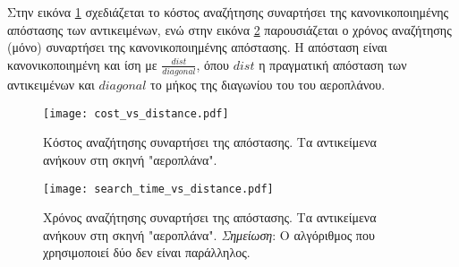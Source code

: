 Στην εικόνα \ref{fig:cost_metric_vs_distance} 
σχεδιάζεται το κόστος αναζήτησης συναρτήσει της 
κανονικοποιημένης απόστασης των αντικειμένων, 
ενώ στην εικόνα \ref{fig:search_time_vs_distance} 
παρουσιάζεται ο χρόνος αναζήτησης (μόνο) συναρτήσει 
της κανονικοποιημένης απόστασης. 
Η απόσταση είναι κανονικοποιημένη και ίση με 
$\frac{dist}{diagonal}$, όπου $dist$ η πραγματική 
απόσταση των αντικειμένων και $diagonal$ το μήκος 
της διαγωνίου του  του αεροπλάνου.


\begin{figure}[H]
    \centering
    \texttt{[image: cost\_vs\_distance.pdf]}
    \caption[Κόστος Αναζήτησης Συναρτήσει της Απόστασης"] {
        Κόστος αναζήτησης συναρτήσει της απόστασης.
        Τα αντικείμενα ανήκουν στη σκηνή "αεροπλάνα".
    }
    \label{fig:cost_metric_vs_distance}
\end{figure}

\begin{figure}[H]
    \centering
    \texttt{[image: search\_time\_vs\_distance.pdf]}
    \caption[Χρόνος Αναζήτησης Συναρτήσει της Απόστασης"] {
        Χρόνος αναζήτησης συναρτήσει της απόστασης.
        Τα αντικείμενα ανήκουν στη σκηνή "αεροπλάνα".
        \textit{Σημείωση}: Ο αλγόριθμος που χρησιμοποιεί δύο  δεν 
        είναι παράλληλος.
    }
    \label{fig:search_time_vs_distance}
\end{figure}




